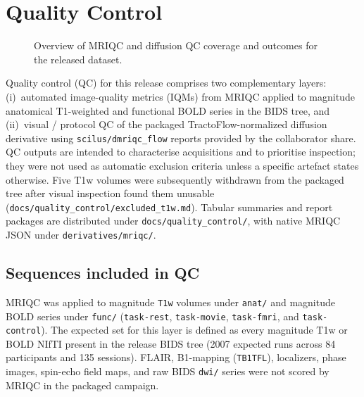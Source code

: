\section{Quality Control}
\label{sec:quality_control}

\begin{figure}[htbp]
    \centering
    \caption{Overview of MRIQC and diffusion QC coverage and outcomes for the released dataset.}
    \label{fig:quality_control}
\end{figure}

Quality control (QC) for this release comprises two complementary layers: (i)~automated image-quality metrics (IQMs) from MRIQC applied to magnitude anatomical T1-weighted and functional BOLD series in the BIDS tree, and (ii)~visual / protocol QC of the packaged TractoFlow-normalized diffusion derivative using \texttt{scilus/dmriqc\_flow} reports provided by the collaborator share. QC outputs are intended to characterise acquisitions and to prioritise inspection; they were not used as automatic exclusion criteria unless a specific artefact states otherwise. Five T1w volumes were subsequently withdrawn from the packaged tree after visual inspection found them unusable (\texttt{docs/quality\_control/excluded\_t1w.md}). Tabular summaries and report packages are distributed under \texttt{docs/quality\_control/}, with native MRIQC JSON under \texttt{derivatives/mriqc/}.

\subsection{Sequences included in QC}

MRIQC was applied to magnitude \texttt{T1w} volumes under \texttt{anat/} and magnitude BOLD series under \texttt{func/} (\texttt{task-rest}, \texttt{task-movie}, \texttt{task-fmri}, and \texttt{task-control}). The expected set for this layer is defined as every magnitude T1w or BOLD NIfTI present in the release BIDS tree (2007 expected runs across 84 participants and 135 sessions). FLAIR, B1-mapping (\texttt{TB1TFL}), localizers, phase images, spin-echo field maps, and raw BIDS \texttt{dwi/} series were not scored by MRIQC in the packaged campaign.

